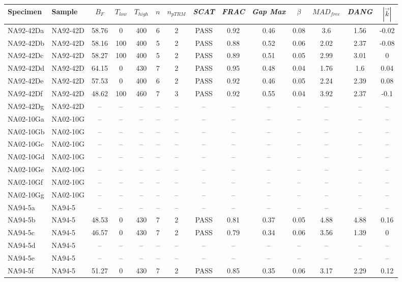 \documentclass[draft]{agujournal2019}
\begin{document}
\begin{landscape}
\begin{longtable}{llcccccccccccc}
\hline
Specimen	&	Sample	&	$B_{F}$	&	$T_{low}$	&	$T_{high}$	&	$n$	&	$n_{pTRM}$	&	\textit{SCAT}	&	\textit{FRAC}	&	\textit{Gap Max}&	$\beta$	&	$MAD_{free}$	&	\textit{DANG}	&	$|\vec{k}|$
 \\
\hline
NA92-42Da	&	NA92-42D	&	58.76	&	0	&	400	&	6	&	2	&	PASS	&	0.92	&	0.46	&	0.08	&	3.6	&	1.56	&	-0.02	\\
NA92-42Db	&	NA92-42D	&	58.16	&	100	&	400	&	5	&	2	&	PASS	&	0.88	&	0.52	&	0.06	&	2.02	&	2.37	&	-0.08	\\
NA92-42Dc	&	NA92-42D	&	58.27	&	100	&	400	&	5	&	2	&	PASS	&	0.89	&	0.51	&	0.05	&	2.99	&	3.01	&	0	\\
NA92-42Dd	&	NA92-42D	&	64.15	&	0	&	430	&	7	&	2	&	PASS	&	0.95	&	0.48	&	0.04	&	1.76	&	1.6	&	0.04	\\
NA92-42De	&	NA92-42D	&	57.53	&	0	&	400	&	6	&	2	&	PASS	&	0.92	&	0.46	&	0.05	&	2.24	&	2.39	&	0.08	\\
NA92-42Df	&	NA92-42D	&	48.62	&	100	&	460	&	7	&	3	&	PASS	&	0.92	&	0.55	&	0.04	&	3.92	&	2.37	&	-0.1	\\
NA92-42Dg	&	NA92-42D	&	–	&	–	&	–	&	–	&	–	&	–	&	–	&	–	&	–	&	–	&	–	&	–	\\
NA02-10Ga	&	NA02-10G	&	–	&	–	&	–	&	–	&	–	&	–	&	–	&	–	&	–	&	–	&	–	&	–	\\
NA02-10Gb	&	NA02-10G	&	–	&	–	&	–	&	–	&	–	&	–	&	–	&	–	&	–	&	–	&	–	&	–	\\
NA02-10Gc	&	NA02-10G	&	–	&	–	&	–	&	–	&	–	&	–	&	–	&	–	&	–	&	–	&	–	&	–	\\
NA02-10Gd	&	NA02-10G	&	–	&	–	&	–	&	–	&	–	&	–	&	–	&	–	&	–	&	–	&	–	&	–	\\
NA02-10Ge	&	NA02-10G	&	–	&	–	&	–	&	–	&	–	&	–	&	–	&	–	&	–	&	–	&	–	&	–	\\
NA02-10Gf	&	NA02-10G	&	–	&	–	&	–	&	–	&	–	&	–	&	–	&	–	&	–	&	–	&	–	&	–	\\
NA02-10Gg	&	NA02-10G	&	–	&	–	&	–	&	–	&	–	&	–	&	–	&	–	&	–	&	–	&	–	&	–	\\
NA94-5a	&	NA94-5	&	–	&	–	&	–	&	–	&	–	&	–	&	–	&	–	&	–	&	–	&	–	&	–	\\
NA94-5b	&	NA94-5	&	48.53	&	0	&	430	&	7	&	2	&	PASS	&	0.81	&	0.37	&	0.05	&	4.88	&	4.88	&	0.16	\\
NA94-5c	&	NA94-5	&	46.57	&	0	&	430	&	7	&	2	&	PASS	&	0.79	&	0.34	&	0.06	&	3.56	&	1.39	&	0	\\
NA94-5d	&	NA94-5	&	–	&	–	&	–	&	–	&	–	&	–	&	–	&	–	&	–	&	–	&	–	&	–	\\
NA94-5e	&	NA94-5	&	–	&	–	&	–	&	–	&	–	&	–	&	–	&	–	&	–	&	–	&	–	&	–	\\
NA94-5f	&	NA94-5	&	51.27	&	0	&	430	&	7	&	2	&	PASS	&	0.85	&	0.35	&	0.06	&	3.17	&	2.29	&	0.12	\\

\end{longtable}
\end{landscape}
\end{document}
